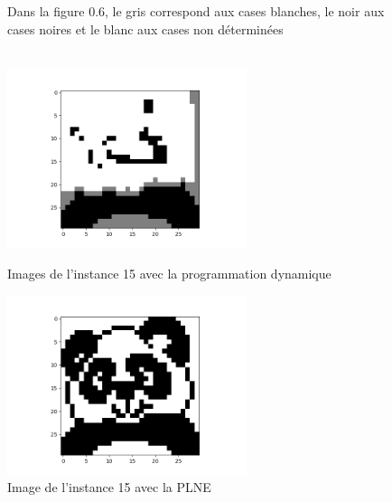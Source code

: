 \documentclass[a4paper]{memoir}
\begin{document}
\begin{figure}[h]
 Dans la figure 0.6, le gris correspond aux cases blanches, le noir aux cases noires et le blanc aux cases non déterminées\\\\
\begin{minipage}[c]{.45\linewidth}
  \centering
    \includegraphics[width = 7cm]{../images/dynamique_instance15.png}
    \caption{Images de l'instance 15 avec la programmation dynamique}
    \label{fig:dynamique15}
\end{minipage}\hfill
\begin{minipage}[c]{.45\linewidth}
    \includegraphics[width = 7cm]{../images/plne_instance15.png}
    \caption{Image de l'instance 15 avec la PLNE}
    \label{fig:plne15}
\end{minipage}
\end{figure}
\end{document}

